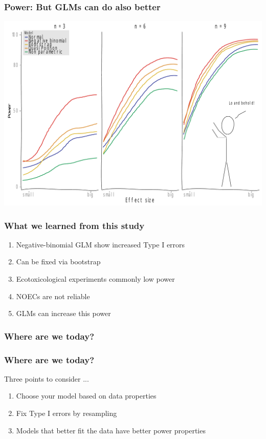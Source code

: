 \documentclass[
	10pt
	]{beamer}
\begin{document}
\begin{frame}
\frametitle{Power: But GLMs can do also better}
	\begin{center}
		\includegraphics[width = \textwidth]{figs/p_pow_xkcd.pdf}
	\end{center}
\end{frame}



\begin{frame}
\frametitle{What we learned from this study}
		\begin{enumerate}
			\item Negative-binomial GLM show increased \alert{Type I errors}
			\item Can be fixed via \alert{bootstrap}
			\item Ecotoxicological experiments commonly \alert{low power} 
			\item \alert{NOECs} are not reliable
			\item \alert{GLMs} can increase this  power
		\end{enumerate}
\end{frame}


\begin{frame}
\frametitle{Where are we today?}
	
\end{frame}


{%
\begin{frame}
\frametitle{Where are we today?}
	\begin{exampleblock}{Three points to consider ...}
		\begin{enumerate}
			\item Choose your model based on data properties
			\item Fix Type I errors by resampling
			\item Models that better fit the data have better power properties
		\end{enumerate}
	\end{exampleblock}
\end{frame}
}
\end{document}
